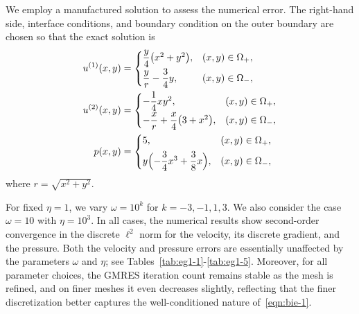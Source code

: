 \documentclass[preprint,11pt]{elsarticle}
\theoremstyle{remark}
\newcommand{\grad}[1]{\nabla #1}
\newcommand{\bm}[1]{\boldsymbol{#1}}
\newcommand{\norm}[1]{\left\lVert #1 \right\rVert}
\begin{document}
We employ a manufactured solution to assess the numerical error. 
The right-hand side, interface conditions, and boundary condition on the outer boundary are chosen so that the exact solution is
\begin{equation}
\begin{aligned}
    u^{(1)}(x,y) &= 
    \begin{cases}
        \dfrac{y}{4}\bigl(x^2 + y^2\bigr), & (x,y)\in\Omega_+,\\[4pt]
        \dfrac{y}{r} - \dfrac{3}{4}y, & (x,y)\in\Omega_-,
    \end{cases} \\
    u^{(2)}(x,y) &=
    \begin{cases}
        -\dfrac{1}{4} x y^2, & (x,y)\in\Omega_+,\\[4pt]
        -\dfrac{x}{r} + \dfrac{x}{4}\bigl(3 + x^2\bigr), & (x,y)\in\Omega_-,
    \end{cases} \\
    p(x,y) &=
    \begin{cases}
        5, & (x,y)\in\Omega_+,\\[4pt]
        y\Bigl(-\dfrac{3}{4}x^3 + \dfrac{3}{8}x\Bigr), & (x,y)\in\Omega_-,
    \end{cases}
\end{aligned}
\end{equation}
where $r = \sqrt{x^2 + y^2}$.

For fixed $\eta = 1$, we vary $\omega = 10^k$ for $k = -3,-1,1,3$. 
We also consider the case $\omega = 10$ with $\eta = 10^3$.
In all cases, the numerical results show second-order convergence in the discrete $\ell^2$ norm for the velocity, its discrete gradient, and the pressure. 
Both the velocity and pressure errors are essentially unaffected by the parameters $\omega$ and $\eta$; see Tables~\ref{tab:eg1-1}-\ref{tab:eg1-5}. 
Moreover, for all parameter choices, the GMRES iteration count remains stable as the mesh is refined, and on finer meshes it even decreases slightly, reflecting that the finer discretization better captures the well-conditioned nature of~\eqref{eqn:bie-1}.

\end{document}
